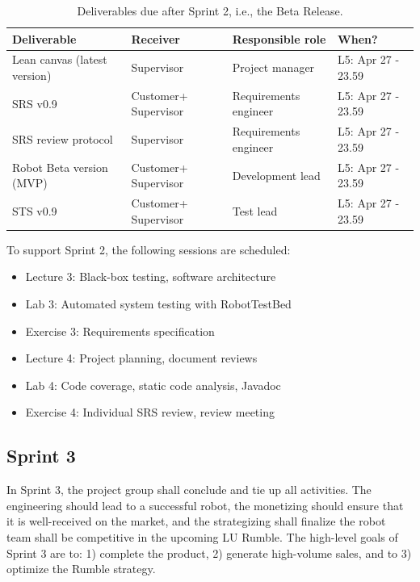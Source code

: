 \documentclass{scrreprt}
\begin{document}
\begin{table}[]
\centering
\caption{Deliverables due after Sprint 2, i.e., the Beta Release.} %
\label{tab:sprint2}
\begin{tabular}{|p{4cm}|p{2cm}|p{2.5cm}|p{4.5cm}|}
\hline
\textbf{Deliverable}           & \textbf{Receiver}   & \textbf{Responsible role} & \textbf{When?}     \\ \hline
Lean canvas (latest version)   & Supervisor          & Project manager           & L5: Apr 27 - 23.59 \\ \hline
SRS v0.9                       & Customer+ Supervisor & Requirements engineer     & L5: Apr 27 - 23.59 \\ \hline
SRS review protocol            & Supervisor & Requirements engineer     & L5: Apr 27 - 23.59 \\ \hline
Robot Beta version (MVP)       & Customer+ Supervisor & Development lead          & L5: Apr 27 - 23.59  \\ \hline
STS v0.9        			   & Customer+ Supervisor & Test lead                 & L5: Apr 27 - 23.59  \\ \hline
\end{tabular}
\end{table}

To support Sprint 2, the following sessions are scheduled:
\begin{itemize}
\item Lecture 3: Black-box testing, software architecture 
\item Lab 3: Automated system testing with RobotTestBed
\item Exercise 3: Requirements specification
\item Lecture 4: Project planning, document reviews
\item Lab 4: Code coverage, static code analysis, Javadoc
\item Exercise 4: Individual SRS review, review meeting
\end{itemize}

\subsection{Sprint 3}
In Sprint 3, the project group shall conclude and tie up all activities. The engineering should lead to a successful robot, the monetizing should ensure that it is well-received on the market, and the strategizing shall finalize the robot team shall be competitive in the upcoming LU Rumble. The high-level goals of Sprint 3 are to: 1) complete the product, 2) generate high-volume sales, and to 3) optimize the Rumble strategy.
\end{document}
